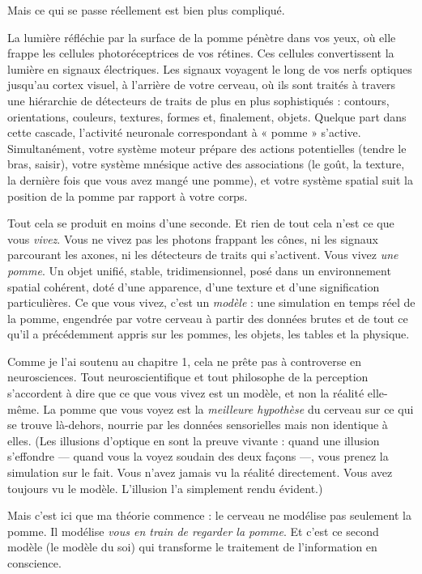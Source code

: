 \documentclass[11pt, twoside, openright]{book}
\begin{document}
Mais ce qui se passe réellement est bien plus compliqué.

La lumière réfléchie par la surface de la pomme pénètre dans vos yeux, où elle frappe les cellules photoréceptrices de vos rétines. Ces cellules convertissent la lumière en signaux électriques. Les signaux voyagent le long de vos nerfs optiques jusqu'au cortex visuel, à l'arrière de votre cerveau, où ils sont traités à travers une hiérarchie de détecteurs de traits de plus en plus sophistiqués : contours, orientations, couleurs, textures, formes et, finalement, objets. Quelque part dans cette cascade, l'activité neuronale correspondant à « pomme » s'active. Simultanément, votre système moteur prépare des actions potentielles (tendre le bras, saisir), votre système mnésique active des associations (le goût, la texture, la dernière fois que vous avez mangé une pomme), et votre système spatial suit la position de la pomme par rapport à votre corps.

Tout cela se produit en moins d'une seconde. Et rien de tout cela n'est ce que vous \textit{vivez}. Vous ne vivez pas les photons frappant les cônes, ni les signaux parcourant les axones, ni les détecteurs de traits qui s'activent. Vous vivez \textit{une pomme}. Un objet unifié, stable, tridimensionnel, posé dans un environnement spatial cohérent, doté d'une apparence, d'une texture et d'une signification particulières. Ce que vous vivez, c'est un \textit{modèle} : une simulation en temps réel de la pomme, engendrée par votre cerveau à partir des données brutes et de tout ce qu'il a précédemment appris sur les pommes, les objets, les tables et la physique.

Comme je l'ai soutenu au chapitre 1, cela ne prête pas à controverse en neurosciences. Tout neuroscientifique et tout philosophe de la perception s'accordent à dire que ce que vous vivez est un modèle, et non la réalité elle-même. La pomme que vous voyez est la \textit{meilleure hypothèse} du cerveau sur ce qui se trouve là-dehors, nourrie par les données sensorielles mais non identique à elles. (Les illusions d'optique en sont la preuve vivante : quand une illusion s'effondre --- quand vous la voyez soudain des deux façons ---, vous prenez la simulation sur le fait. Vous n'avez jamais vu la réalité directement. Vous avez toujours vu le modèle. L'illusion l'a simplement rendu évident.)

Mais c'est ici que ma théorie commence : le cerveau ne modélise pas seulement la pomme. Il modélise \textit{vous en train de regarder la pomme}. Et c'est ce second modèle (le modèle du soi) qui transforme le traitement de l'information en conscience.
\end{document}
